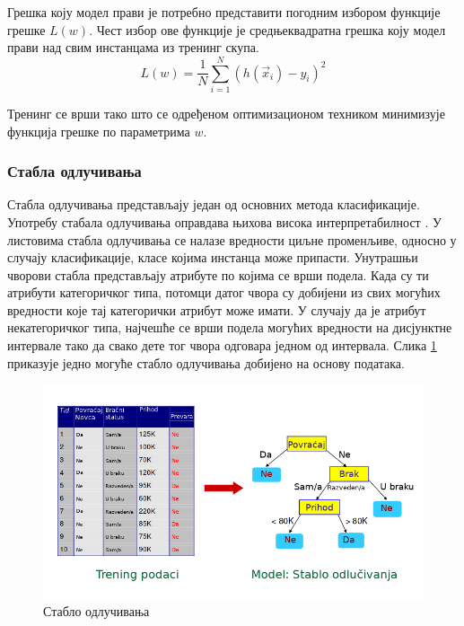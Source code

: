 \documentclass[a4paper]{article}
\begin{document}
{Грешка коју модел прави је потребно представити погодним избором функције грешке $L(w)$. Чест избор ове функције је средњеквадратна грешка коју модел прави над свим инстанцама из тренинг скупа.
\begin{equation}
L(w) = \frac{1}{N}\sum \limits_{i=1}^{N} (h(\vec{x}_i) - y_i)^2
\end{equation}

Тренинг се врши тако што се одређеном оптимизационом техником минимизује функција грешке по параметрима $w$.


\subsubsection*{Стабла одлучивања}
Стабла одлучивања представљају један од основних метода класификације. Употребу стабала одлучивања оправдава њихова висока интерпретабилност \cite{dct-survey}. У листовима стабла одлучивања се налазе вредности циљне променљиве, односно у случају класификације, класе којима инстанца може припасти. Унутрашњи чворови стабла представљају атрибуте по којима се врши подела. Када су ти атрибути категоричког типа, потомци датог чвора су добијени из свих могућих вредности које тај категорички атрибут може имати. У случају да је атрибут некатегоричког типа, најчешће се врши подела могућих вредности на дисјунктне интервале тако да свако дете тог чвора одговара једном од интервала. Слика \ref{fig:stablo} приказује једно могуће стабло одлучивања добијено на основу података.

\begin{figure}[h!]
\begin{center}
\includegraphics[scale=0.4]{./slike/decision_tree.png}
\end{center}
\caption{Стабло одлучивања}
\label{fig:stablo}
\end{figure}


}
\end{document}
